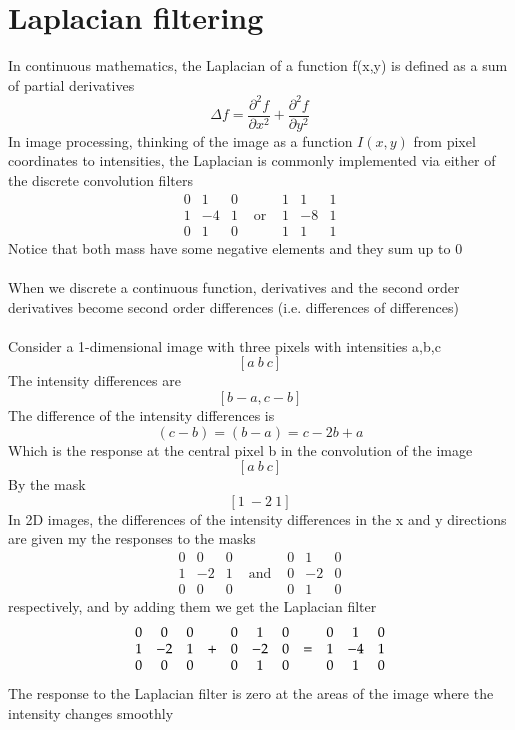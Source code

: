 \documentclass{article}[18pt]
\begin{document}
\section{Laplacian filtering}
In continuous mathematics, the Laplacian of a function f(x,y) is defined as a sum of partial derivatives
\[
\Delta f=\frac{\partial^{2} f}{\partial x^{2}}+\frac{\partial^{2} f}{\partial y^{2}}
\]
In image processing, thinking of the image as a function $I(x,y)$ from pixel coordinates to intensities, the Laplacian is commonly implemented via either of the discrete convolution filters
\[
\begin{array}{ccccccc}{0} & {1} & {0} & {} & {1} & {1} & {1} \\ {1} & {-4} & {1} & {\text { or }} & {1} & {-8} & {1} \\ {0} & {1} & {0} & {} & {1} & {1} & {1}\end{array}
\]
Notice that both mass have some negative elements and they sum up to 0\\
\\
When we discrete a continuous function, derivatives and the second order derivatives become second order differences (i.e. differences of differences)\\
\\
Consider a 1-dimensional image with three pixels with intensities a,b,c
$$[a  \ b \ c]$$ 
The intensity differences are
$$[b-a,c-b]$$
The difference of the intensity differences is
$$(c-b)=(b-a)=c-2b+a$$
Which is the response at the central pixel b in the convolution of the image
$$[a \ b \ c]$$
By the mask
$$[1 \ -2 \ 1]$$
In 2D images, the differences of the intensity differences in the x and y directions are given my the responses to the masks
\[
\begin{array}{ccccccc}{0} & {0} & {0} & {} & {0} & {1} & {0} \\ {1} & {-2} & {1} & {\text { and }} & {0} & {-2} & {0} \\ {0} & {0} & {0} & {} & {0} & {1} & {0}\end{array}
\]
respectively, and by adding them we get the Laplacian filter
\[
\begin{array}{ccccccc c ccc}
{0} & {0} & {0} & {} & {0} & {1} & {0} & &0&1&0 \\
 {1} & {-2} & {1} & {\text {+}} & {0} & {-2} & {0} & = &1&-4&1 \\
  {0} & {0} & {0} & {} & {0} & {1} & {0} & & 0&1&0
  \end{array}
\]
The response to the Laplacian filter is zero at the areas of the image where the intensity changes smoothly\\
\end{document}
